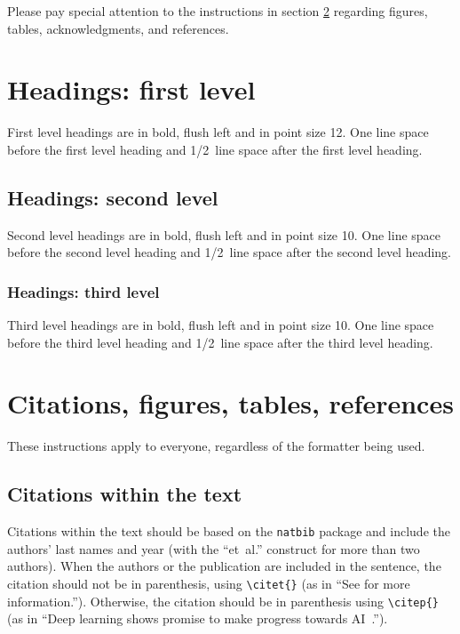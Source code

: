 \documentclass[10pt]{article} %
\begin{document}
Please pay special attention to the instructions in section \ref{others}
regarding figures, tables, acknowledgments, and references.

\section{Headings: first level}
\label{headings}

First level headings are in bold,
flush left and in point size 12. One line space before the first level
heading and 1/2~line space after the first level heading.

\subsection{Headings: second level}

Second level headings are in bold,
flush left and in point size 10. One line space before the second level
heading and 1/2~line space after the second level heading.

\subsubsection{Headings: third level}

Third level headings are in bold,
flush left and in point size 10. One line space before the third level
heading and 1/2~line space after the third level heading.

\section{Citations, figures, tables, references}
\label{others}

These instructions apply to everyone, regardless of the formatter being used.

\subsection{Citations within the text}

Citations within the text should be based on the \texttt{natbib} package
and include the authors' last names and year (with the ``et~al.'' construct
for more than two authors). When the authors or the publication are
included in the sentence, the citation should not be in parenthesis, using \verb|\citet{}| (as
in ``See \citet{Hinton06} for more information.''). Otherwise, the citation
should be in parenthesis using \verb|\citep{}| (as in ``Deep learning shows promise to make progress
towards AI~\citep{Bengio+chapter2007}.'').
\end{document}
